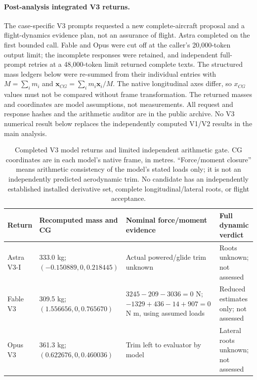\documentclass[11pt,a4paper]{article}
\begin{document}
\paragraph{Post-analysis integrated V3 returns.}
The case-specific V3 prompts requested a new complete-aircraft proposal and a
flight-dynamics evidence plan, not an assurance of flight. Astra completed on
the first bounded call. Fable and Opus were cut off at the caller's 20,000-token
output limit; the incomplete responses were retained, and independent
full-prompt retries at a 48,000-token limit returned complete texts. The
structured mass ledgers below were re-summed from their individual entries
with $M=\sum_i m_i$ and $\mathbf{x}_{CG}=\sum_i m_i\mathbf{x}_i/M$.
The native longitudinal axes differ, so $x_{CG}$ values must not be compared
without frame transformation. The returned masses and coordinates are
model assumptions, not measurements. All request and response hashes and the
arithmetic auditor are in the public archive. No V3 numerical result below
replaces the independently computed V1/V2 results in the main analysis.

\begin{table}[H]\centering\footnotesize
\caption{Completed V3 model returns and limited independent arithmetic gate. CG coordinates are in each model's native frame, in metres. ``Force/moment closure'' means arithmetic consistency of the model's stated loads only; it is not an independently predicted aerodynamic trim. No candidate has an independently established installed derivative set, complete longitudinal/lateral roots, or flight acceptance.}\label{tab:v3returns}
\begin{tabularx}{\linewidth}{lXXX}\toprule
Return & Recomputed mass and CG & Nominal force/moment evidence & Full dynamic verdict\\\midrule
Astra V3-I & 333.0 kg; $(-0.150889,0,0.218445)$ & Actual powered/glide trim unknown & Roots unknown; not assessed\\
Fable V3 & 309.5 kg; $(1.556656,0,0.765670)$ & $3245-209-3036=0$ N; $-1329+436-14+907=0$ N m, using assumed loads & Reduced estimates only; not assessed\\
Opus V3 & 361.3 kg; $(0.622676,0,0.460036)$ & Trim left to evaluator by model & Lateral roots unknown; not assessed\\\bottomrule
\end{tabularx}
\end{table}
\end{document}
